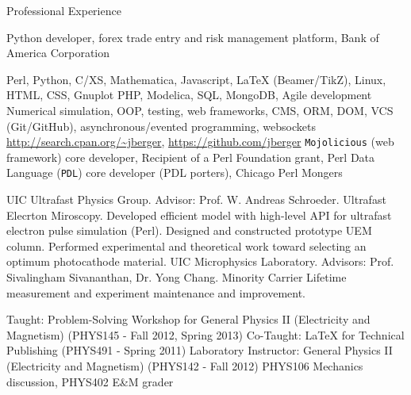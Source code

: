 \begin{rubric}{Professional Experience}


   Python developer, forex trade entry and risk management platform, Bank of America Corporation


  \entry*[Proficient in] Perl, Python, C/XS, Mathematica, Javascript, \LaTeX{} (Beamer/TikZ), Linux, HTML, CSS, Gnuplot
   PHP, Modelica, SQL, MongoDB, Agile development
  \entry*[Concepts] Numerical simulation, OOP, testing, web frameworks, CMS, ORM, DOM, VCS (Git/GitHub), asynchronous/evented programming, websockets
  \entry*[Code] \url{http://search.cpan.org/~jberger}, \url{https://github.com/jberger}
  \entry*[Affiliations] \texttt{Mojolicious} (web framework) core developer, Recipient of a Perl Foundation grant, Perl Data Language (\texttt{PDL}) core developer (PDL porters), Chicago Perl Mongers
  

  \entry*[2005 --- 2013] UIC Ultrafast Physics Group. Advisor: Prof. W. Andreas Schroeder. Ultrafast Elecrton Miroscopy.
  \entry* Developed efficient model with high-level API for ultrafast electron pulse simulation (Perl). 
  \entry* Designed and constructed prototype UEM column.
  \entry* Performed experimental and theoretical work toward selecting an optimum photocathode material.
  \entry*[2003 --- 2005] UIC Microphysics Laboratory. Advisors: Prof. Sivalingham Sivananthan, Dr. Yong Chang.
  \entry* Minority Carrier Lifetime measurement and experiment maintenance and improvement.


  \entry*[Teaching] Taught: Problem-Solving Workshop for General Physics II (Electricity and Magnetism) (PHYS145 - Fall 2012, Spring 2013) 
  \entry*[Teaching] Co-Taught: \LaTeX{} for Technical Publishing (PHYS491 - Spring 2011)
  \entry*[T.A.] Laboratory Instructor: General Physics II (Electricity and Magnetism) (PHYS142 - Fall 2012)
  \entry*[T.A.] PHYS106 Mechanics discussion, PHYS402 E\&M grader

\end{rubric}
